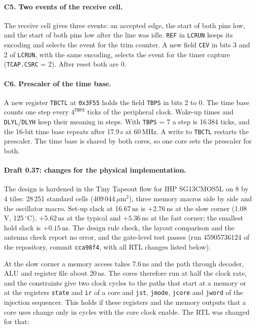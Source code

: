 \documentclass[10pt,a4paper]{article}
\newcommand{\reg}[1]{\texttt{#1}}
\begin{document}
\paragraph{C5. Two events of the receive cell.} The receive cell gives three events: an accepted edge, the start
of both pins low, and the start of both pins low after the line was idle. \reg{REF} in \reg{LCRUN} keeps its
encoding and selects the event for the trim counter. A new field \reg{CEV} in bits 3 and 2 of \reg{LCRUN}, with
the same encoding, selects the event for the timer capture (\reg{TCAP.CSRC} = 2). After reset both are 0.

\paragraph{C6. Prescaler of the time base.} A new register \reg{TBCTL} at \texttt{0x3F55} holds the field
\reg{TBPS} in bits 2 to 0. The time base counts one step every $4^{\mathtt{TBPS}}$ ticks of the peripheral clock.
Wake-up times and \reg{DLYL}/\reg{DLYH} keep their meaning in steps. With \reg{TBPS} = 7 a step is 16\,384 ticks, and the 16-bit
time base repeats after 17.9\,s at 60\,MHz. A write to \reg{TBCTL} restarts the prescaler. The time base is
shared by both cores, so one core sets the prescaler for both.

\paragraph{Draft 0.37: changes for the physical implementation.}\label{sec:impl037}
The design is hardened in the Tiny Tapeout flow for IHP SG13CMOS5L on 8 by 4 tiles: 28\,251 standard cells
(409\,044\,$\mu$m$^2$), three memory macros side by side and the oscillator macro. Set-up slack at 16.67\,ns is
$+2.76$\,ns at the slow corner (1.08\,V, 125\,$^\circ$C), $+5.62$\,ns at the typical and $+5.36$\,ns at the fast
corner; the smallest hold slack is $+0.15$\,ns. The design rule check, the layout comparison and the antenna
check report no error, and the gate-level test passes (run 45905736124 of the repository, commit
\texttt{cca98f4}, with all RTL changes listed below).

At the slow corner a memory access takes 7.6\,ns and the path through decoder, ALU and register file about
20\,ns. The cores therefore run at half the clock rate, and the constraints give two clock cycles to the paths
that start at a memory or at the registers \texttt{state} and \texttt{ir} of a core and \texttt{jst},
\texttt{jmode}, \texttt{jcore} and \texttt{jword} of the injection sequencer. This holds if these registers
and the memory outputs that a core uses change only in cycles with the core clock enable. The RTL was changed
for that:
\end{document}
